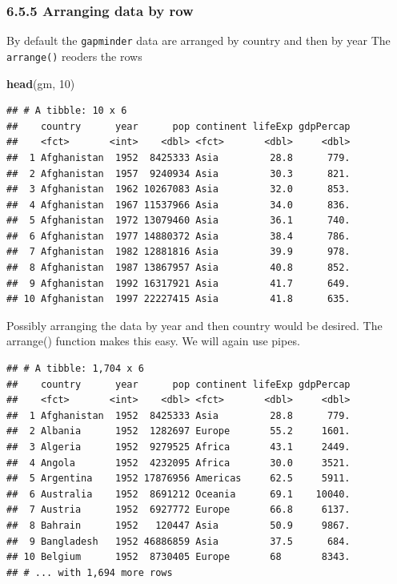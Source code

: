\documentclass[]{article}
\newenvironment{Shaded}{\begin{snugshade}}{\end{snugshade}}
\newcommand{\KeywordTok}[1]{\textcolor[rgb]{0.13,0.29,0.53}{\textbf{#1}}}
\newcommand{\DecValTok}[1]{\textcolor[rgb]{0.00,0.00,0.81}{#1}}
\newcommand{\StringTok}[1]{\textcolor[rgb]{0.31,0.60,0.02}{#1}}
\newcommand{\OperatorTok}[1]{\textcolor[rgb]{0.81,0.36,0.00}{\textbf{#1}}}
\newcommand{\NormalTok}[1]{#1}
\begin{document}
\subsubsection{6.5.5 Arranging data by row}\label{arranging-data-by-row}

By default the \texttt{gapminder} data are arranged by country and then
by year The \texttt{arrange()} reoders the rows

\begin{Shaded}
\begin{Highlighting}[]
\KeywordTok{head}\NormalTok{(gm, }\DecValTok{10}\NormalTok{)}
\end{Highlighting}
\end{Shaded}

\begin{verbatim}
## # A tibble: 10 x 6
##    country      year      pop continent lifeExp gdpPercap
##    <fct>       <int>    <dbl> <fct>       <dbl>     <dbl>
##  1 Afghanistan  1952  8425333 Asia         28.8      779.
##  2 Afghanistan  1957  9240934 Asia         30.3      821.
##  3 Afghanistan  1962 10267083 Asia         32.0      853.
##  4 Afghanistan  1967 11537966 Asia         34.0      836.
##  5 Afghanistan  1972 13079460 Asia         36.1      740.
##  6 Afghanistan  1977 14880372 Asia         38.4      786.
##  7 Afghanistan  1982 12881816 Asia         39.9      978.
##  8 Afghanistan  1987 13867957 Asia         40.8      852.
##  9 Afghanistan  1992 16317921 Asia         41.7      649.
## 10 Afghanistan  1997 22227415 Asia         41.8      635.
\end{verbatim}

Possibly arranging the data by year and then country would be desired.
The arrange() function makes this easy. We will again use pipes.

\begin{Shaded}
\end{Shaded}

\begin{verbatim}
## # A tibble: 1,704 x 6
##    country      year      pop continent lifeExp gdpPercap
##    <fct>       <int>    <dbl> <fct>       <dbl>     <dbl>
##  1 Afghanistan  1952  8425333 Asia         28.8      779.
##  2 Albania      1952  1282697 Europe       55.2     1601.
##  3 Algeria      1952  9279525 Africa       43.1     2449.
##  4 Angola       1952  4232095 Africa       30.0     3521.
##  5 Argentina    1952 17876956 Americas     62.5     5911.
##  6 Australia    1952  8691212 Oceania      69.1    10040.
##  7 Austria      1952  6927772 Europe       66.8     6137.
##  8 Bahrain      1952   120447 Asia         50.9     9867.
##  9 Bangladesh   1952 46886859 Asia         37.5      684.
## 10 Belgium      1952  8730405 Europe       68       8343.
## # ... with 1,694 more rows
\end{verbatim}
\end{document}
